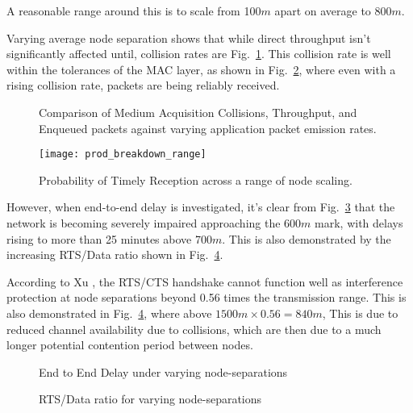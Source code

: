 A reasonable range around this is to scale from 100$m$ apart on average to 800$m$.

Varying average node separation shows that while direct throughput isn't significantly affected until, collision rates are Fig.~\ref{fig:throughput_performance_range}.
This collision rate is well within the tolerances of the MAC layer, as shown in Fig.~\ref{fig:prod_breakdown_range}, where even with a rising collision rate, packets are being reliably received.

\begin{figure}[H]
	\centering
	\caption{Comparison of Medium Acquisition Collisions, Throughput, and Enqueued packets against varying application packet emission rates.}
	\label{fig:throughput_performance_range}
\end{figure}

\begin{figure}[H]
	\centering
	\texttt{[image: prod\_breakdown\_range]}
	\caption{Probability of Timely Reception across a range of node scaling.}
	\label{fig:prod_breakdown_range}
\end{figure}

However, when end-to-end delay is investigated, it's clear from Fig.~\ref{fig:delay_range} that the network is becoming severely impaired approaching the 600$m$ mark, with delays rising to more than 25 minutes above 700$m$.
This is also demonstrated by the increasing RTS/Data ratio shown in Fig.~\ref{fig:rts_range}.

According to Xu \cite{Xu2002}, the RTS/CTS handshake cannot function well as interference protection at node separations beyond 0.56 times the transmission range. 
This is also demonstrated in  Fig.~\ref{fig:rts_range}, where above $1500m \times 0.56 = 840m$, 
This is due to reduced channel availability due to collisions, which are then due to a much longer potential contention period between nodes. 

\begin{figure}[H]
	\centering
	\caption{End to End Delay under varying node-separations}
	\label{fig:delay_range}
\end{figure}

\begin{figure}[H]
	\centering
	\caption{RTS/Data ratio for varying node-separations}
	\label{fig:rts_range}
\end{figure}


